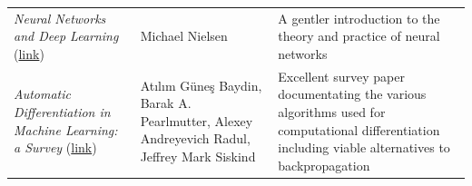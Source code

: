 \documentclass[
]{article}
\begin{document}
\begin{longtable}[]{@{}lll@{}}
\begin{minipage}[t]{0.30\columnwidth}
\emph{Neural Networks and Deep Learning}
(\href{http://neuralnetworksanddeeplearning.com/index.html}{link})\strut
\end{minipage} & \begin{minipage}[t]{0.30\columnwidth}\raggedright
Michael Nielsen\strut
\end{minipage} & \begin{minipage}[t]{0.30\columnwidth}\raggedright
A gentler introduction to the theory and practice of neural
networks\strut
\end{minipage}\tabularnewline
\begin{minipage}[t]{0.30\columnwidth}\raggedright
\emph{Automatic Differentiation in Machine Learning: a Survey}
(\href{https://arxiv.org/pdf/1502.05767.pdf}{link})\strut
\end{minipage} & \begin{minipage}[t]{0.30\columnwidth}\raggedright
Atılım Güneş Baydin, Barak A. Pearlmutter, Alexey Andreyevich Radul,
Jeffrey Mark Siskind\strut
\end{minipage} & \begin{minipage}[t]{0.30\columnwidth}\raggedright
Excellent survey paper documentating the various algorithms used for
computational differentiation including viable alternatives to
backpropagation\strut
\end{minipage}\tabularnewline
\bottomrule
\end{longtable}
\end{document}
